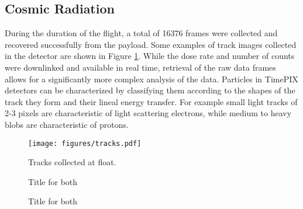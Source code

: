 \subsection{Cosmic Radiation}
\label{sec:Cosmic-Radiation-Results}

During the duration of the flight, a total of 16376 frames were collected and recovered successfully from the payload. Some examples of track images collected in the detector are shown in Figure \ref{tracks}. While the dose rate and number of counts were downlinked and available in real time, retrieval of the raw data frames allows for a significantly more complex analysis of the data. Particles in TimePIX detectors can be characterized by classifying them according to the shapes of the track they form and their lineal energy transfer. For example small light tracks of 2-3 pixels are characteristic of light scattering electrons, while medium to heavy blobs are characteristic of protons.

\begin{figure}[H]
	\begin{center}
	\texttt{[image: figures/tracks.pdf]}
	\caption{Tracks collected at float.}
	\label{tracks}
	\end{center}
\end{figure}

\begin{figure}[H]
\hfill
{}
\hfill
{}
\hfill
\caption{Title for both}
\end{figure}

\begin{figure}[H]
\hfill
{}
\hfill
{}
\hfill
\caption{Title for both}
\end{figure}

